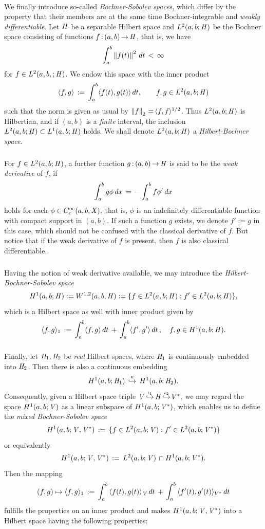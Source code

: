 \documentclass[11pt,twoside]{article}
\begin{document}
\paragraph*{} %
We finally introduce so-called \textit{Bochner-Sobolev spaces},
which differ by the property
that their members are at the same time
Bochner-integrable and \textit{weakly differentiable}.
Let $\hilH$ be a separable Hilbert space and $L^2(a,b;\hilH)$ be
the Bochner space consisting of functions $f\:(a,b) \xto \hilH$,
that is,
we have
\[
\int_a^b \norm{f(t)}^2 \,dt \, < \, \infty
\]
for $f \in L^2(a,b,;\hilH)$.
We endow this space with the inner product
\[
\scalar{f}{g} \eqdef \int_a^b \scalar{f(t)}{g(t)} \,dt,
\quad \quad
f,g \in L^2(a,b;\hilH)
\]
such that the norm is given as usual by
$\norm{f}_2 \eq \scalar{f}{f}^{1/2}$.
Thus $L^2(a,b;\hilH)$ is Hilbertian,
and if $(a,b)$ is a \textit{finite} interval,
the inclusion $L^2(a,b;\hilH) \subset L^1(a,b;\hilH)$ holds.
We shall denote $L^2(a,b;\hilH)$ a \textit{Hilbert-Bochner space}.

\subparagraph*{} %
For $f \in L^2(a,b;\hilH)$,
a further function $g\:(a,b) \xto \hilH$ is said to be
the \textit{weak derivative} of $f$,
if
\[
\int_a^b g \phi \,dx \= - \int_a^b f \phi' \,dx
\]
holds for each $\phi \in C_c^{\infty}(a,b,\banX)$,
that is,
$\phi$ is an indefinitely differentiable function with compact support
in $(a,b)$.
If such a function $g$ exists,
we denote $f' := g$ in this case,
which should not be confused with the classical derivative of $f$.
But notice that if the weak derivative of $f$ is present,
then $f$ is also classical differentiable.

\subparagraph*{} %
Having the notion of weak derivative available,
we may introduce the \textit{Hilbert-Bochner-Sobolev space}
\[
H^1(a,b;\hilH) :=
W^{1,2}(a,b,\hilH) :=
\{f \in L^2(a,b;\hilH): f' \in L^2(a,b;\hilH) \},
\]
which is a Hilbert space as well with inner product given by
\[
\scalar{f}{g}_1 \eqdef
\int_a^b \scalar{f}{g} \, dt
\, + \,
\int_a^b \scalar{f'}{g'} \, dt\,,
\quad f,g \in H^1(a,b;\hilH).
\]

\subparagraph*{} %
Finally,
let $\hilH_1, \hilH_2$ be \textit{real} Hilbert spaces,
where $\hilH_1$ is continuously embedded into $\hilH_2$.
Then there is also a continuous embedding
\[
H^1(a,b;\hilH_1) \, \overset{\kappa}{\hookrightarrow} \, H^1(a,b;\hilH_2).
\]
Consequently,
given a Hilbert space triple 
$
\vecV \, {\overset{\iota_1}{\hookrightarrow}} \,
\hilH \, {\overset{\iota_2}{\hookrightarrow}} \vecV^*,
$
we may regard the space $H^1(a,b;\vecV)$
as a linear subspace of $H^1(a,b;\vecV^*)$,
which enables us to define the \textit{mixed Bochner-Sobolev space}
\[
H^1(a,b;\vecV,\vecV^*) \eqdef
\{ f \in L^2(a,b;\vecV): f' \in L^2(a,b;\vecV^*) \}
\]
or equivalently
\[
H^1(a,b;\vecV,\vecV^*) \eqdef L^2(a,b;\vecV) \, \cap H^1(a,b;\vecV^*).
\]
Then the mapping
\[
(f,g) \mapsto \scalar{f}{g}_1 \eqdef
\int_a^b \, \scalar{f(t)}{g(t)}_{\vecV} \, dt
\, + \,
\int_a^b \, \scalar{f'(t)}{g'(t)}_{V^*} \, dt
\]
fulfills the properties on an inner product
and makes $H^1(a,b;\vecV,\vecV^*)$ into a Hilbert space
having the following properties:
\end{document}
